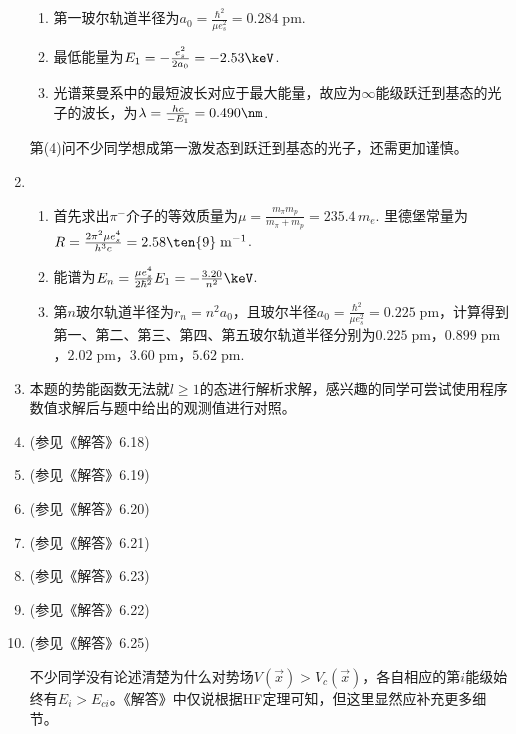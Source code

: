 \begin{enumerate}[label=\textbf{5.\arabic*}, listparindent=\parindent]
\begin{enumerate}[label=(\arabic*)]
    \item 第一玻尔轨道半径为$a_0 = \frac{\hbar^2}{\mu e_s^2} = 0.284\;\mathrm{pm}$.
    
    \item 最低能量为$E_1 = -\frac{e_s^2}{2 a_0} = -2.53\keV$.
    
    \item 光谱莱曼系中的最短波长对应于最大能量，故应为$\infty$能级跃迁到基态的光子的波长，为$\lambda = \frac{hc}{-E_1} = 0.490\nm$.
\end{enumerate}


第(4)问不少同学想成第一激发态到跃迁到基态的光子，还需更加谨慎。


\item
\begin{enumerate}[label=(\arabic*)]
    \item 首先求出$\pi^-$介子的等效质量为$\mu = \frac{m_\pi m_p}{m_\pi+m_p} = 235.4\,m_e$. 里德堡常量为$R = \frac{2\pi^2 \mu e_s^4}{h^3 c} = 2.58\ten{9}\;\mathrm{m^{-1}}$.
    \item 能谱为$E_n = \frac{\mu e_s^4}{2\hbar^2}E_1 = -\frac{3.20}{n^2}\keV$.
    \item 第$n$玻尔轨道半径为$r_n = n^2a_0$，且玻尔半径$a_0 = \frac{\hbar^2}{\mu e_s^2} = 0.225\;\mathrm{pm}$，计算得到第一、第二、第三、第四、第五玻尔轨道半径分别为$0.225\;\mathrm{pm}$，$0.899\;\mathrm{pm}$，$2.02\;\mathrm{pm}$，$3.60\;\mathrm{pm}$，$5.62\;\mathrm{pm}$.
\end{enumerate}

\item 本题的势能函数无法就$l\geq 1$的态进行解析求解，感兴趣的同学可尝试使用程序数值求解后与题中给出的观测值进行对照。

\item (参见《解答》6.18)

\item (参见《解答》6.19)

\item (参见《解答》6.20)

\item (参见《解答》6.21)

\item (参见《解答》6.23)

\item (参见《解答》6.22)

\item (参见《解答》6.25)

不少同学没有论述清楚为什么对势场$V(\vec{x})>V_c(\vec{x})$，各自相应的第$i$能级始终有$E_i>E_{ci}$。《解答》中仅说根据HF定理可知，但这里显然应补充更多细节。


\end{enumerate}
